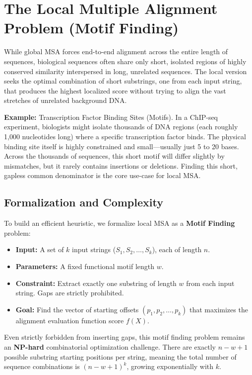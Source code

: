 \section{The Local Multiple Alignment Problem (Motif Finding)}
While global MSA forces end-to-end alignment across the entire length of sequences, biological sequences often share only short, isolated regions of highly conserved similarity interspersed in long, unrelated sequences. The local version seeks the optimal combination of short substrings, one from each input string, that produces the highest localized score without trying to align the vast stretches of unrelated background DNA.

\textbf{Example:} Transcription Factor Binding Sites (Motifs).
In a ChIP-seq experiment, biologists might isolate thousands of DNA regions (each roughly 1,000 nucleotides long) where a specific transcription factor binds. The physical binding site itself is highly constrained and small—usually just 5 to 20 bases. Across the thousands of sequences, this short motif will differ slightly by mismatches, but it rarely contains insertions or deletions. Finding this short, gapless common denominator is the core use-case for local MSA.

\subsection{Formalization and Complexity}
To build an efficient heuristic, we formalize local MSA as a \textbf{Motif Finding} problem:
\begin{itemize}
  \item \textbf{Input:} A set of $k$ input strings ($S_1, S_2, \dots, S_k$), each of length $n$.
  \item \textbf{Parameters:} A fixed functional motif length $w$.
  \item \textbf{Constraint:} Extract exactly one substring of length $w$ from each input string. Gaps are strictly prohibited.
  \item \textbf{Goal:} Find the vector of starting offsets $(p_1, p_2, \dots, p_k)$ that maximizes the alignment evaluation function score $f(X)$.
\end{itemize}

Even strictly forbidden from inserting gaps, this motif finding problem remains an \textbf{NP-hard} combinatorial optimization challenge. There are exactly $n - w + 1$ possible substring starting positions per string, meaning the total number of sequence combinations is $(n - w + 1)^k$, growing exponentially with $k$.

